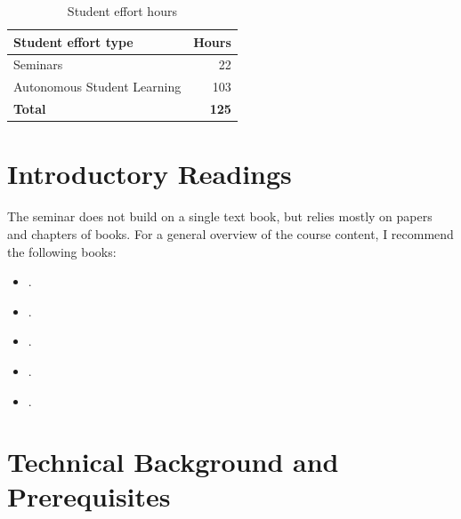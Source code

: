 \documentclass[abstract=on,parskip=full,headings=standardclasses,fontsize=11pt,paper=a4]{scrartcl}
\begin{document}

\begin{table}[h] \centering \onehalfspacing
\caption*{Student effort hours}
\begin{tabular}{ l r} 
\toprule
Student effort type &  Hours \\
\midrule
Seminars & 22 \\
Autonomous Student Learning  & 103 \\
\textbf{Total} & \textbf{125} \\
\bottomrule
\end{tabular}
\end{table}



\section*{Introductory Readings}

The seminar does not build on a single text book, but relies mostly on papers and chapters of books. For  a general overview of the course content, I recommend the following books:

\begin{itemize}
\item {}.
\item {}.
\item {}.
\item {}.
\item {}.
\end{itemize}




\section*{Technical Background and Prerequisites}
\end{document}
